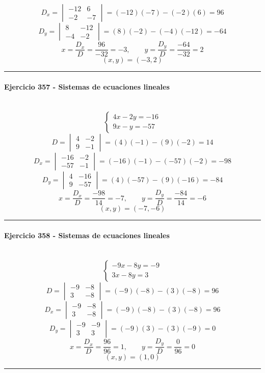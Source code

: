 \documentclass[10pt,a4paper]{article}
\newcommand{\res}[1]{\paragraph{#1}\mbox{}\\[-1.2em]}
\begin{document}
\[ D_x=\begin{vmatrix}-12&6\\-2&-7\end{vmatrix}=(-12)(-7)-(-2)(6)=96 \]
\[ D_y=\begin{vmatrix}8&-12\\-4&-2\end{vmatrix}=(8)(-2)-(-4)(-12)=-64 \]
\[ x=\frac{D_x}{D}=\frac{96}{-32}=-3,\qquad y=\frac{D_y}{D}=\frac{-64}{-32}=2 \]
\[ \boxed{(x,y)=(-3,2)} \]
\vspace{1mm}\hrule\vspace{2mm}
\res{Ejercicio 357 - Sistemas de ecuaciones lineales}
\[ \begin{cases}4 x - 2 y=-16\\9 x - y=-57\end{cases} \]
\[ D=\begin{vmatrix}4&-2\\9&-1\end{vmatrix}=(4)(-1)-(9)(-2)=14 \]
\[ D_x=\begin{vmatrix}-16&-2\\-57&-1\end{vmatrix}=(-16)(-1)-(-57)(-2)=-98 \]
\[ D_y=\begin{vmatrix}4&-16\\9&-57\end{vmatrix}=(4)(-57)-(9)(-16)=-84 \]
\[ x=\frac{D_x}{D}=\frac{-98}{14}=-7,\qquad y=\frac{D_y}{D}=\frac{-84}{14}=-6 \]
\[ \boxed{(x,y)=(-7,-6)} \]
\vspace{1mm}\hrule\vspace{2mm}
\res{Ejercicio 358 - Sistemas de ecuaciones lineales}
\[ \begin{cases}- 9 x - 8 y=-9\\3 x - 8 y=3\end{cases} \]
\[ D=\begin{vmatrix}-9&-8\\3&-8\end{vmatrix}=(-9)(-8)-(3)(-8)=96 \]
\[ D_x=\begin{vmatrix}-9&-8\\3&-8\end{vmatrix}=(-9)(-8)-(3)(-8)=96 \]
\[ D_y=\begin{vmatrix}-9&-9\\3&3\end{vmatrix}=(-9)(3)-(3)(-9)=0 \]
\[ x=\frac{D_x}{D}=\frac{96}{96}=1,\qquad y=\frac{D_y}{D}=\frac{0}{96}=0 \]
\[ \boxed{(x,y)=(1,0)} \]
\vspace{1mm}\hrule\vspace{2mm}
\end{document}
